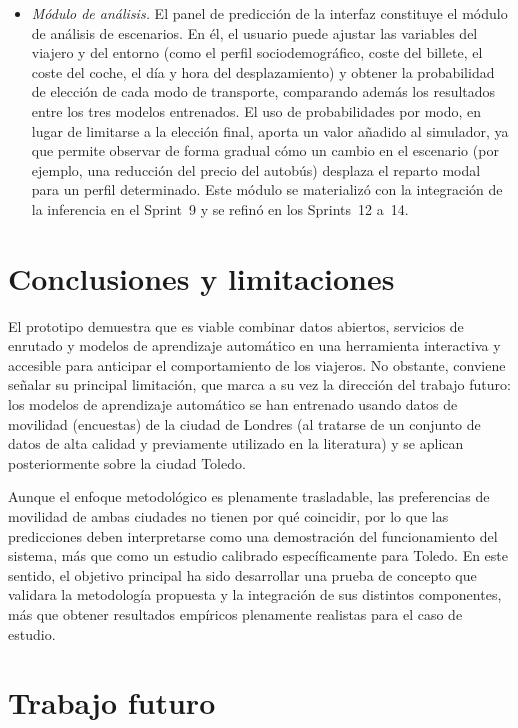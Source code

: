 \begin{itemize}
    \item \textit{Módulo de análisis.} El panel de predicción de la interfaz constituye el módulo de análisis de escenarios. En él, el usuario puede ajustar las variables del viajero y del entorno (como el perfil sociodemográfico, coste del billete, el coste del coche, el día y hora del desplazamiento) y obtener la probabilidad de elección de cada modo de transporte, comparando además los resultados entre los tres modelos entrenados. El uso de probabilidades por modo, en lugar de limitarse a la elección final, aporta un valor añadido al simulador, ya que permite observar de forma gradual cómo un cambio en el escenario (por ejemplo, una reducción del precio del autobús) desplaza el reparto modal para un perfil determinado. Este módulo se materializó con la integración de la inferencia en el Sprint~9 y se refinó en los Sprints~12 a~14.
\end{itemize}

\newpage
\section{Conclusiones y limitaciones}

El prototipo demuestra que es viable combinar datos abiertos, servicios de enrutado y modelos de aprendizaje automático en una herramienta interactiva y accesible para anticipar el comportamiento de los viajeros. No obstante, conviene señalar su principal limitación, que marca a su vez la dirección del trabajo futuro: los modelos de aprendizaje automático se han entrenado usando datos de movilidad (encuestas) de la ciudad de Londres (al tratarse de un conjunto de datos de alta calidad y previamente utilizado en la literatura) y se aplican posteriormente sobre la ciudad Toledo.\newline

Aunque el enfoque metodológico es plenamente trasladable, las preferencias de movilidad de ambas ciudades no tienen por qué coincidir, por lo que las predicciones deben interpretarse como una demostración del funcionamiento del sistema, más que como un estudio calibrado específicamente para Toledo. En este sentido, el objetivo principal ha sido desarrollar una prueba de concepto que validara la metodología propuesta y la integración de sus distintos componentes, más que obtener resultados empíricos plenamente realistas para el caso de estudio.\newline

\section{Trabajo futuro}

